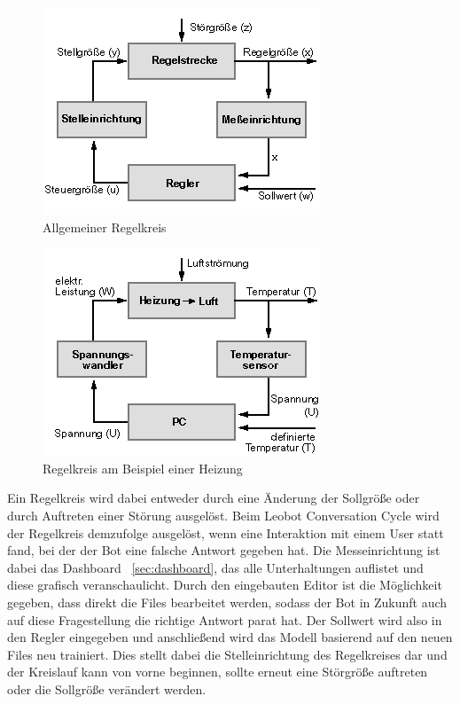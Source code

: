 \begin{figure}[hbt!]
    \centering
    \includegraphics[scale=0.8]{pics/regelkreis}
    \caption{Allgemeiner Regelkreis ~\cite{regelkreis}}
    \label{fig:regelkreis}
\end{figure}

\begin{figure}[hbt!]
    \centering
    \includegraphics[scale=0.8]{pics/regelkreis_heizung}
    \caption{Regelkreis am Beispiel einer Heizung ~\cite{regelkreis}}
    \label{fig:heizungRegelKreis}
\end{figure}

Ein Regelkreis wird dabei entweder durch eine Änderung der Sollgröße oder durch Auftreten einer Störung ausgelöst.
Beim Leobot Conversation Cycle wird der Regelkreis demzufolge ausgelöst, wenn eine Interaktion mit einem User statt fand, bei der der Bot eine falsche Antwort gegeben hat.
Die Messeinrichtung ist dabei das Dashboard ~\ref{sec:dashboard}, das alle Unterhaltungen auflistet und diese grafisch veranschaulicht.
Durch den eingebauten Editor ist die Möglichkeit gegeben, dass direkt die Files bearbeitet werden, sodass der Bot in Zukunft auch auf diese Fragestellung die richtige Antwort parat hat.
Der Sollwert wird also in den Regler eingegeben und anschließend wird das Modell basierend auf den neuen Files neu trainiert.
Dies stellt dabei die Stelleinrichtung des Regelkreises dar und der Kreislauf kann von vorne beginnen, sollte erneut eine Störgröße auftreten oder die Sollgröße verändert werden.


